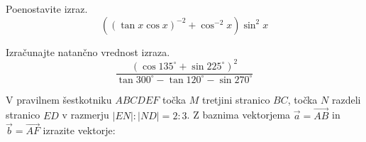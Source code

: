 \documentclass[addpoints]{exam}
\begin{document}
\begin{questions}


    \question[4]
    Poenostavite izraz. 
    $$\displaystyle \left(\left(\tan{x}\cos{x}\right)^{-2}+\cos^{-2}{x}\right)\sin^2{x} $$

    \begin{solution}[6.5cm]
       
    \end{solution}



    \question[5]
    Izračunajte natančno vrednost izraza. 
    $$\displaystyle \dfrac{\left(\cos{135^\circ}+\sin{225^\circ}\right)^2}{\tan{300^\circ}-\tan{120^\circ}-\sin{270^\circ}} $$

    \begin{solution}[6cm]
       
    \end{solution}


\newpage

    \question
    V pravilnem šestkotniku $ABCDEF$ točka $M$ tretjini stranico $BC$, točka $N$ razdeli stranico $ED$ v razmerju $|EN|:|ND|=2:3$.
    Z baznima vektorjema $\overrightarrow{a}=\overrightarrow{AB}$ in $\overrightarrow{b}=\overrightarrow{AF}$ izrazite vektorje: 

    \begin{solution}[4cm]

    \end{solution}

    

    


\end{questions}
\end{document}
